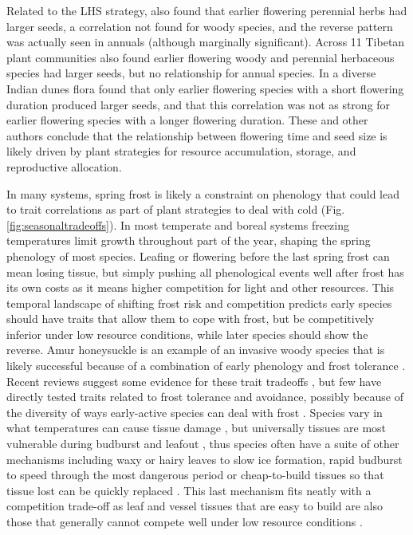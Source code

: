 \documentclass[11pt]{article}
\begin{document}
Related to the LHS strategy, \citet{bolmgren2008time} also found that earlier flowering perennial herbs had larger seeds, a correlation not found for woody species, and the reverse pattern was actually seen in annuals (although marginally significant). Across 11 Tibetan plant communities \citet{du2010trade} also found earlier flowering woody and perennial herbaceous species had larger seeds, but no relationship for annual species. In a diverse Indian dunes flora \citet{mazer1990seed} found that only earlier flowering species with a short flowering duration produced larger seeds, and that this correlation was not as strong for earlier flowering species with a longer flowering duration. These and other authors conclude that the relationship between flowering time and seed size is likely driven by plant strategies for resource accumulation, storage, and reproductive allocation.

In many systems, spring frost is likely a constraint on phenology that could lead to trait correlations as part of plant strategies to deal with cold (Fig. \ref{fig:seasonaltradeoffs}). In most temperate and boreal systems freezing temperatures limit growth throughout part of the year, shaping the spring phenology of most species. Leafing or flowering before the last spring frost can mean losing tissue, but simply pushing all phenological events well after frost has its own costs as it means higher competition for light and other resources.  This temporal landscape of shifting frost risk and competition predicts early species should have traits that allow them to cope with frost, but be competitively inferior under low resource conditions, while later species should show the reverse. Amur honeysuckle is an example of an invasive woody species that is likely successful because of a combination of early phenology and frost tolerance \citep{mcewan2009leaf}. Recent reviews suggest some evidence for these trait tradeoffs \citep{wolkovich2014aob,wolkovich2021phenological}, but few have directly tested traits related to frost tolerance and avoidance, possibly because of the diversity of ways early-active species can deal with frost \citep{frostbook}. Species vary in what temperatures can cause tissue damage \citep{Lenz2013}, but universally tissues are most vulnerable during budburst and leafout \citep{frostbook,vitasse2014earlier,cat2019}, thus species often have a suite of other mechanisms including waxy or hairy leaves to slow ice formation, rapid budburst to speed through the most dangerous period or cheap-to-build tissues so that tissue lost can be quickly replaced \citep{frostbook}. This last mechanism fits neatly with a competition trade-off as leaf and vessel tissues that are easy to build are also those that generally cannot compete well under low resource conditions \citep{larcher1980,diaz2016global}. 
\end{document}
